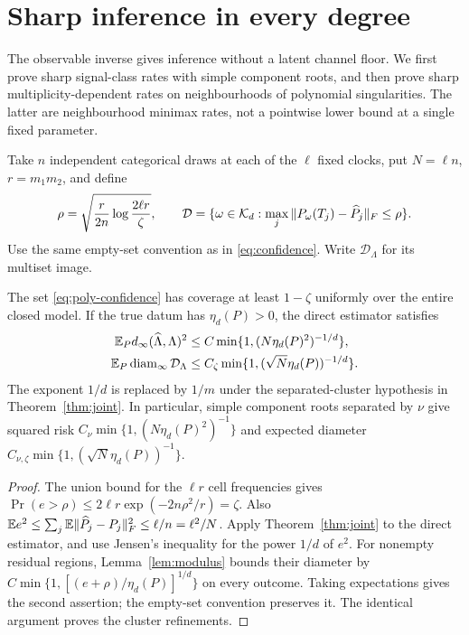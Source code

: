 \section{Sharp inference in every degree}
\label{sec:polynomial-statistics}
The observable inverse gives inference without a latent channel floor.
We first prove sharp signal-class rates with simple component roots,
and then prove sharp multiplicity-dependent rates on neighbourhoods of
polynomial singularities. The latter are neighbourhood minimax rates,
not a pointwise lower bound at a single fixed parameter.

Take $n$ independent categorical draws at each of the $\ell$ fixed
clocks, put $N=\ell n$, $r=m_1m_2$, and define
\begin{equation}\label{eq:poly-confidence}
 \rho=\sqrt{\frac{r}{2n}\log\frac{2\ell r}{\zeta}},\qquad
 \mathcal D=\{\omega\in\mathcal K_d:
       \max_j\|P_\omega(T_j)-\widehat P_j\|_F\le\rho\}.
\end{equation}
Use the same empty-set convention as in \eqref{eq:confidence}. Write
$\mathcal D_\Lambda$ for its multiset image.

\begin{theorem}\label{thm:poly-inference}
The set \eqref{eq:poly-confidence} has coverage at least $1-\zeta$
uniformly over the entire closed model. If the true datum has
$\eta_d(P)>0$, the direct estimator satisfies
\begin{align}
 \mathbb E_Pd_\infty(\widehat\Lambda,\Lambda)^2
 &\le C\min\{1,(N\eta_d(P)^2)^{-1/d}\},\nonumber\\
 \mathbb E_P\operatorname{diam}_\infty\mathcal D_\Lambda
 &\le C_\zeta\min\{1,(\sqrt N\eta_d(P))^{-1/d}\}.
                                                       \label{eq:poly-upper}
\end{align}
The exponent $1/d$ is replaced by $1/m$ under the separated-cluster
hypothesis in Theorem~\ref{thm:joint}. In particular, simple component
roots separated by $\nu$ give squared risk
$C_\nu\min\{1,(N\eta_d(P)^2)^{-1}\}$ and expected diameter
$C_{\nu,\zeta}\min\{1,(\sqrt N\eta_d(P))^{-1}\}$.
\end{theorem}
\begin{proof}
The union bound for the $\ell r$ cell frequencies gives
$\Pr(e>\rho)\le2\ell r\exp(-2n\rho^2/r)=\zeta$.
Also $\mathbb E e^2\le\sum_j\mathbb E\|\widehat P_j-P_j\|_F^2\le\ell/n=\ell^2/N$.
Apply Theorem~\ref{thm:joint} to the direct estimator, and use Jensen's
inequality for the power $1/d$ of $e^2$. For nonempty residual regions,
Lemma~\ref{lem:modulus} bounds their diameter by
$C\min\{1,[(e+\rho)/\eta_d(P)]^{1/d}\}$ on every outcome. Taking
expectations gives the second assertion; the empty-set convention
preserves it. The identical argument proves the cluster refinements.
\end{proof}

